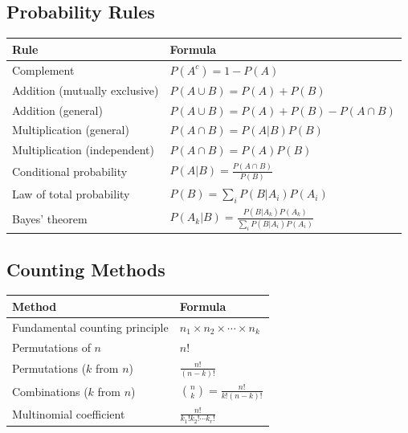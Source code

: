 \documentclass[11pt]{article}
\begin{document}
\subsection*{Probability Rules}
\begin{center}
\begin{tabular}{l l}
\toprule
\textbf{Rule} & \textbf{Formula} \\
\midrule
Complement & \(P(A^c)=1-P(A)\) \\
Addition (mutually exclusive) & \(P(A\cup B)=P(A)+P(B)\) \\
Addition (general) & \(P(A\cup B)=P(A)+P(B)-P(A\cap B)\) \\
Multiplication (general) & \(P(A\cap B)=P(A|B)P(B)\) \\
Multiplication (independent) & \(P(A\cap B)=P(A)P(B)\) \\
Conditional probability & \(P(A|B)=\frac{P(A\cap B)}{P(B)}\) \\
Law of total probability & \(P(B)=\sum_i P(B|A_i)P(A_i)\) \\
Bayes' theorem & \(P(A_k|B)=\frac{P(B|A_k)P(A_k)}{\sum_i P(B|A_i)P(A_i)}\) \\
\bottomrule
\end{tabular}
\end{center}

\subsection*{Counting Methods}
\begin{center}
\begin{tabular}{l l}
\toprule
\textbf{Method} & \textbf{Formula} \\
\midrule
Fundamental counting principle & \(n_1\times n_2\times\cdots\times n_k\) \\
Permutations of \(n\) & \(n!\) \\
Permutations (\(k\) from \(n\)) & \(\frac{n!}{(n-k)!}\) \\
Combinations (\(k\) from \(n\)) & \(\binom{n}{k}=\frac{n!}{k!(n-k)!}\) \\
Multinomial coefficient & \(\frac{n!}{k_1!k_2!\cdots k_r!}\) \\
\bottomrule
\end{tabular}
\end{center}
\end{document}
